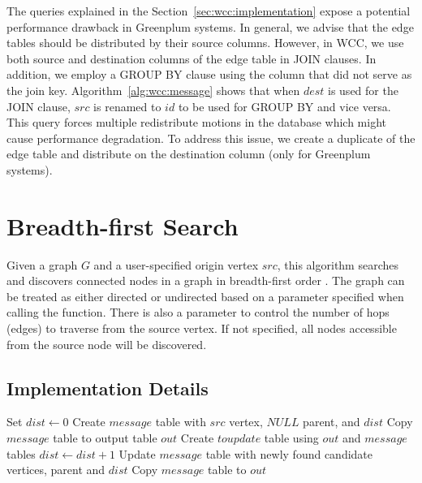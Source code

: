 The queries explained in the Section~\ref{sec:wcc:implementation} expose a
potential performance drawback in Greenplum systems. In general, we advise
that the edge tables should be distributed by their source columns. However,
in WCC, we use both source and destination columns of the edge table in JOIN
clauses. In addition, we employ a GROUP BY clause using the column that did
not serve as the join key. Algorithm~\ref{alg:wcc:message} shows that when $dest$
is used for the JOIN clause, $src$ is renamed to $id$ to be used for GROUP BY
and vice versa. This query forces multiple redistribute motions in the
database which might cause performance degradation. To address this issue, we
create a duplicate of the edge table and distribute on the destination column
(only for Greenplum systems).

\section{Breadth-first Search} \label{sec:graph:bfs}

Given a graph $G$ and a user-specified origin vertex $src$, this algorithm
searches and discovers connected nodes in a graph in breadth-first order
\cite{bfs_wikipedia}. The graph can be treated as either directed or
undirected based on a parameter specified when calling the function.
There is also a parameter to control the number of hops (edges) to traverse
from the source vertex. If not specified, all nodes accessible from the
source node will be discovered.

\subsection{Implementation Details}
\begin{algorithm} \label{alg:bfs:high}
\begin{algorithmic}[1]
    \State Set $dist \leftarrow 0$
    \State Create $message$ table with $src$ vertex, $NULL$ parent, and $dist$
    \State Copy $message$ table to output table $out$
    \Repeat
        \State Create $toupdate$ table using $out$ and $message$ tables
        \State $dist \leftarrow dist + 1$
        \State Update $message$ table with newly found candidate vertices, parent and $dist$
        \State Copy $message$ table to $out$
\end{algorithmic}
\end{algorithm}

